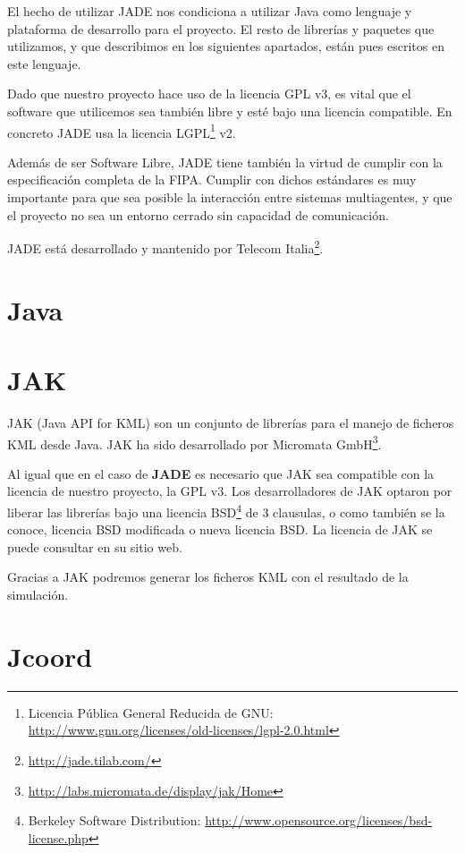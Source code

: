 El hecho de utilizar JADE nos condiciona a utilizar Java como lenguaje y
plataforma de desarrollo para el proyecto. El resto de librerías y paquetes que
utilizamos, y que describimos en los siguientes apartados, están pues escritos
en este lenguaje.

Dado que nuestro proyecto hace uso de la licencia GPL v3, es vital que el
software que utilicemos sea también libre y esté bajo una licencia compatible.
En concreto JADE usa la licencia LGPL\footnote{Licencia Pública General Reducida
de GNU: \url{http://www.gnu.org/licenses/old-licenses/lgpl-2.0.html}} v2.

Además de ser Software Libre, JADE tiene también la virtud de cumplir con la
especificación completa de la FIPA. Cumplir con dichos estándares es muy
importante para que sea posible la interacción entre sistemas multiagentes, y
que el proyecto no sea un entorno cerrado sin capacidad de comunicación.

JADE está desarrollado y mantenido por Telecom
Italia\footnote{\url{http://jade.tilab.com/}}.

\section*{Java}

\section*{JAK}

JAK (Java API for KML) son un conjunto de librerías para el manejo de ficheros
KML desde Java. JAK ha sido desarrollado por Micromata
GmbH\footnote{\url{http://labs.micromata.de/display/jak/Home}}.


Al igual que en el caso de {\bf JADE} es necesario que JAK sea compatible con
la licencia de nuestro proyecto, la GPL v3. %
Los desarrolladores de JAK optaron por liberar las librerías bajo una licencia
BSD\footnote{Berkeley Software Distribution:
\url{http://www.opensource.org/licenses/bsd-license.php}} de 3 clausulas, o como
también se la conoce, licencia BSD modificada o nueva licencia BSD. La licencia
de JAK se puede consultar en su sitio web.

Gracias a JAK podremos generar los ficheros KML con el resultado de la
simulación.

\section*{Jcoord}

